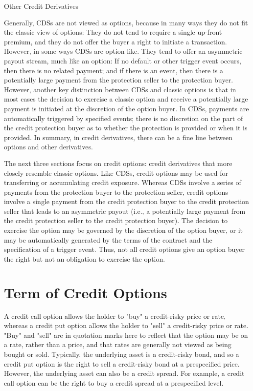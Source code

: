 \documentclass[11pt]{article}
\begin{document}
Other Credit Derivatives

Generally, CDSs are not viewed as options, because in many ways they do not fit the classic view of options: They do not tend to require a single up-front premium, and they do not offer the buyer a right to initiate a transaction. However, in some ways CDSs are option-like. They tend to offer an asymmetric payout stream, much like an option: If no default or other trigger event occurs, then there is no related payment; and if there is an event, then there is a potentially large payment from the protection seller to the protection buyer. However, another key distinction between CDSs and classic options is that in most cases the decision to exercise a classic option and receive a potentially large payment is initiated at the discretion of the option buyer. In CDSs, payments are automatically triggered by specified events; there is no discretion on the part of the credit protection buyer as to whether the protection is provided or when it is provided. In summary, in credit derivatives, there can be a fine line between options and other derivatives.

The next three sections focus on credit options: credit derivatives that more closely resemble classic options. Like CDSs, credit options may be used for transferring or accumulating credit exposure. Whereas CDSs involve a series of payments from the protection buyer to the protection seller, credit options involve a single payment from the credit protection buyer to the credit protection seller that leads to an asymmetric payout (i.e., a potentially large payment from the credit protection seller to the credit protection buyer). The decision to exercise the option may be governed by the discretion of the option buyer, or it may be automatically generated by the terms of the contract and the specification of a trigger event. Thus, not all credit options give an option buyer the right but not an obligation to exercise the option.

\section*{Term of Credit Options}
A credit call option allows the holder to "buy" a credit-risky price or rate, whereas a credit put option allows the holder to "sell" a credit-risky price or rate. "Buy" and "sell" are in quotation marks here to reflect that the option may be on a rate, rather than a price, and that rates are generally not viewed as being bought or sold. Typically, the underlying asset is a credit-risky bond, and so a credit put option is the right to sell a credit-risky bond at a prespecified price. However, the underlying asset can also be a credit spread. For example, a credit call option can be the right to buy a credit spread at a prespecified level.
\end{document}
